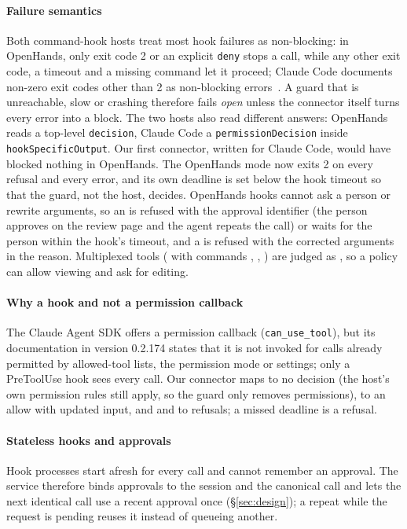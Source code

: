 \paragraph{Failure semantics}
Both command-hook hosts treat most hook failures as non-blocking: in OpenHands, only exit code 2 or an explicit \texttt{deny} stops a call, while any other exit code, a timeout and a missing command let it proceed; Claude Code documents non-zero exit codes other than 2 as non-blocking errors~\cite{claudehooks}. A guard that is unreachable, slow or crashing therefore fails \emph{open} unless the connector itself turns every error into a block. The two hosts also read different answers: OpenHands reads a top-level \texttt{decision}, Claude Code a \texttt{permissionDecision} inside \texttt{hookSpecificOutput}. Our first connector, written for Claude Code, would have blocked nothing in OpenHands. The OpenHands mode now exits 2 on every refusal and every error, and its own deadline is set below the hook timeout so that the guard, not the host, decides. OpenHands hooks cannot ask a person or rewrite arguments, so an  is refused with the approval identifier (the person approves on the review page and the agent repeats the call) or waits for the person within the hook's timeout, and a  is refused with the corrected arguments in the reason. Multiplexed tools ( with commands , , ) are judged as , so a policy can allow viewing and ask for editing.

\paragraph{Why a hook and not a permission callback}
The Claude Agent SDK offers a permission callback (\texttt{can\_use\_tool}), but its documentation in version 0.2.174 states that it is not invoked for calls already permitted by allowed-tool lists, the permission mode or settings; only a PreToolUse hook sees every call. Our connector maps  to no decision (the host's own permission rules still apply, so the guard only removes permissions),  to an allow with updated input, and  and  to refusals; a missed deadline is a refusal.

\paragraph{Stateless hooks and approvals}
Hook processes start afresh for every call and cannot remember an approval. The service therefore binds approvals to the session and the canonical call and lets the next identical call use a recent approval once (\S\ref{sec:design}); a repeat while the request is pending reuses it instead of queueing another.

